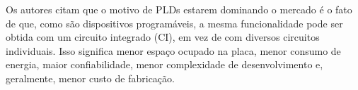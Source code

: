 		Os autores \cite{tocci2003sistemas, Plessl2003} citam que o motivo de PLDs estarem dominando o mercado é o fato de que, como são dispositivos programáveis, a mesma funcionalidade pode ser obtida com um circuito integrado (CI), em vez de com diversos circuitos individuais. 
        Isso significa menor espaço ocupado na placa, menor consumo de energia, maior confiabilidade, menor complexidade de desenvolvimento e, geralmente, menor custo de fabricação.

